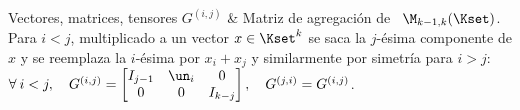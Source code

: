 \begin{notation}{Vectores, matrices, tensores}
%
$G^{(i,j)}$ & Matriz de agregaci\'on de \ $\M_{k-1,k}(\Kset)$. Para $i < j$,
multiplicado a un vector $x \in \Kset^k$ se saca la $j$-\'esima componente de
$x$ y se reemplaza la $i$-\'esima por $x_i + x_j$ y similarmente por simetr\'ia
para $i > j$:\vspace{1mm}\newline $\forall \: i < j, \quad G^{(i,j)} =
\protect\begin{bmatrix} I_{j-1} & \un_i & 0\\ 0 & 0 &
I_{k-j} \end{bmatrix}\protect, \quad G^{(j,i)} =
G^{(i,j)}$.\vspace{1mm}\\[2.5mm]
\hline

\end{notation}
